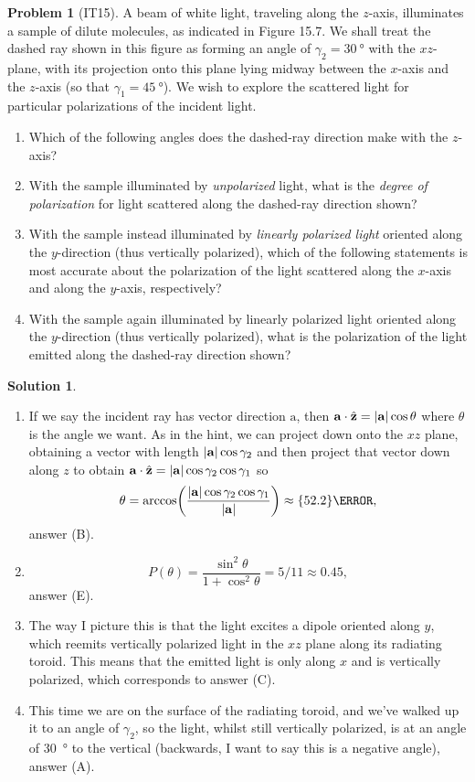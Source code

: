 \documentclass[10pt]{article}
\theoremstyle{definition}
\newtheorem{problem}{Problem}
\newtheorem{soln}{Solution}
\newcommand{\uz}{\hat{\mathbf{z}}}
\newcommand{\bv}[1]{\bm{\mathrm{#1}}}
\begin{document}
\begin{problem}[IT15]
A beam of white light, traveling along the $z$-axis, illuminates a sample of dilute molecules, as indicated in Figure 15.7.
We shall treat the dashed ray shown in this figure as forming an angle of $\gamma_2=\qty{30}{\degree}$ with the $xz$-plane, with its projection
onto this plane lying midway between the $x$-axis and the $z$-axis (so that $\gamma_1=\qty{45}{\degree}$). We wish to
explore the scattered light for particular polarizations of the incident light.
\begin{enumerate}[label=(\roman*)]
  \item Which of the following angles does the dashed-ray direction make with the $z$-axis?
  \item With the sample illuminated by \emph{unpolarized} light, what is the \emph{degree of polarization} for light scattered along the dashed-ray direction
        shown?
  \item With the sample instead illuminated by \emph{linearly polarized light} oriented along the $y$-direction (thus vertically polarized), which of the
        following statements is most accurate about the polarization of the light scattered along the $x$-axis and along the $y$-axis, respectively?
  \item With the sample again illuminated by linearly polarized light oriented along the $y$-direction (thus vertically polarized), what is
        the polarization of the light emitted along the dashed-ray direction shown?
\end{enumerate}
\end{problem}
\begin{soln}~
  \begin{enumerate}[label=(\roman*)]
    \item If we say the incident ray has vector direction $\bv{a}$, then $\bv{a}\cdot\uz=\abs{\bv{a}}\cos\theta$ where $\theta$ is the angle
          we want. As in the hint, we can project down onto the $xz$ plane, obtaining a vector with length $\abs{\bv{a}}\cos\gamma_2$
          and then project that vector down along $z$ to obtain $\bv{a}\cdot\uz=\abs{\bv{a}}\cos\gamma_2\cos\gamma_1$ so
          $$\theta=\arccos(\frac{\abs{\bv{a}}\cos\gamma_2\cos\gamma_1}{\abs{\bv{a}}})\approx \qty{52.2}{\degree},$$
          answer (B).
    \item $$P(\theta)=\frac{\sin^2\theta}{1+\cos^2\theta}=5/11\approx0.45,$$
          answer (E).
    \item The way I picture this is that the light excites a dipole oriented along $y$, which reemits vertically polarized light in the $xz$ plane along its
          radiating toroid. This means that the emitted light is only along $x$ and is vertically polarized, which corresponds to answer (C).
    \item This time we are on the surface of the radiating toroid, and we've walked up it to an angle of $\gamma_2$, so the light, whilst still
          vertically polarized, is at an angle of \qty{30}{\degree} to the vertical (backwards, I want to say this is a negative angle), answer (A).
  \end{enumerate}
\end{soln}
\end{document}
